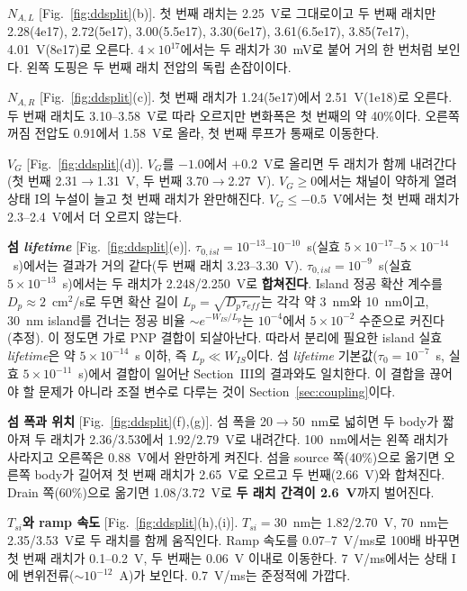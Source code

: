\documentclass[journal]{IEEEtran}
\begin{document}
\textbf{$N_{A,L}$} [Fig.~\ref{fig:ddsplit}(b)]. 첫 번째 래치는 2.25~V로 그대로이고 두 번째 래치만 2.28(4e17), 2.72(5e17), 3.00(5.5e17), 3.30(6e17), 3.61(6.5e17), 3.85(7e17), 4.01~V(8e17)로 오른다. $4\times10^{17}$에서는 두 래치가 30~mV로 붙어 거의 한 번처럼 보인다. 왼쪽 도핑은 두 번째 래치 전압의 독립 손잡이이다.

\textbf{$N_{A,R}$} [Fig.~\ref{fig:ddsplit}(c)]. 첫 번째 래치가 1.24(5e17)에서 2.51~V(1e18)로 오른다. 두 번째 래치도 3.10--3.58~V로 따라 오르지만 변화폭은 첫 번째의 약 40\%이다. 오른쪽 꺼짐 전압도 0.91에서 1.58~V로 올라, 첫 번째 루프가 통째로 이동한다.

\textbf{$V_G$} [Fig.~\ref{fig:ddsplit}(d)]. $V_G$를 $-1.0$에서 $+0.2$~V로 올리면 두 래치가 함께 내려간다(첫 번째 2.31$\rightarrow$1.31~V, 두 번째 3.70$\rightarrow$2.27~V). $V_G\ge0$에서는 채널이 약하게 열려 상태 I의 누설이 늘고 첫 번째 래치가 완만해진다. $V_G\le-0.5$~V에서는 첫 번째 래치가 2.3--2.4~V에서 더 오르지 않는다.

\textbf{섬 \textit{lifetime}} [Fig.~\ref{fig:ddsplit}(e)]. $\tau_{0,isl}=10^{-13}$--$10^{-10}$~s(실효 $5\times10^{-17}$--$5\times10^{-14}$~s)에서는 결과가 거의 같다(두 번째 래치 3.23--3.30~V). $\tau_{0,isl}=10^{-9}$~s(실효 $5\times10^{-13}$~s)에서는 두 래치가 2.248/2.250~V로 \textbf{합쳐진다}. Island 정공 확산 계수를 $D_p\approx2$~cm$^2$/s로 두면 확산 길이 $L_p=\sqrt{D_p\tau_{eff}}$는 각각 약 3~nm와 10~nm이고, 30~nm island를 건너는 정공 비율 $\sim e^{-W_{IS}/L_p}$는 $10^{-4}$에서 $5\times10^{-2}$ 수준으로 커진다(추정). 이 정도면 가로 PNP 결합이 되살아난다. 따라서 분리에 필요한 island 실효 \textit{lifetime}은 약 $5\times10^{-14}$~s 이하, 즉 $L_p\ll W_{IS}$이다. 섬 \textit{lifetime} 기본값($\tau_0=10^{-7}$~s, 실효 $5\times10^{-11}$~s)에서 결합이 일어난 Section~III의 결과와도 일치한다. 이 결합을 끊어야 할 문제가 아니라 조절 변수로 다루는 것이 Section~\ref{sec:coupling}이다.

\textbf{섬 폭과 위치} [Fig.~\ref{fig:ddsplit}(f),(g)]. 섬 폭을 20$\rightarrow$50~nm로 넓히면 두 body가 짧아져 두 래치가 2.36/3.53에서 1.92/2.79~V로 내려간다. 100~nm에서는 왼쪽 래치가 사라지고 오른쪽은 0.88~V에서 완만하게 켜진다. 섬을 source 쪽(40\%)으로 옮기면 오른쪽 body가 길어져 첫 번째 래치가 2.65~V로 오르고 두 번째(2.66~V)와 합쳐진다. Drain 쪽(60\%)으로 옮기면 1.08/3.72~V로 \textbf{두 래치 간격이 2.6~V}까지 벌어진다.

\textbf{$T_{si}$와 ramp 속도} [Fig.~\ref{fig:ddsplit}(h),(i)]. $T_{si}=30$~nm는 1.82/2.70~V, 70~nm는 2.35/3.53~V로 두 래치를 함께 움직인다. Ramp 속도를 0.07--7~V/ms로 100배 바꾸면 첫 번째 래치가 0.1--0.2~V, 두 번째는 0.06~V 이내로 이동한다. 7~V/ms에서는 상태 I에 변위전류($\sim10^{-12}$~A)가 보인다. 0.7~V/ms는 준정적에 가깝다.
\end{document}
